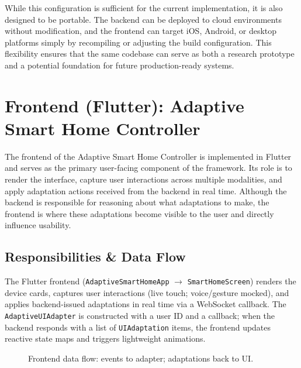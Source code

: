 \documentclass[openany]{book}
\begin{document}
While this configuration is sufficient for the current implementation, it is also designed to be portable. The backend can be deployed to cloud environments without modification, and the frontend can target iOS, Android, or desktop platforms simply by recompiling or adjusting the build configuration. This flexibility ensures that the same codebase can serve as both a research prototype and a potential foundation for future production-ready systems.

\section{Frontend (Flutter): Adaptive Smart Home Controller}
The frontend of the Adaptive Smart Home Controller is implemented in Flutter and serves as the primary user-facing component of the framework. Its role is to render the interface, capture user interactions across multiple modalities, and apply adaptation actions received from the backend in real time. Although the backend is responsible for reasoning about what adaptations to make, the frontend is where these adaptations become visible to the user and directly influence usability.

\subsection{Responsibilities \& Data Flow}
The Flutter frontend (\texttt{AdaptiveSmartHomeApp} $\rightarrow$ \texttt{SmartHomeScreen}) renders the device cards, captures user interactions (live touch; voice/gesture mocked), and applies backend-issued adaptations in real time via a WebSocket callback. The \texttt{AdaptiveUIAdapter} is constructed with a user ID and a callback; when the backend responds with a list of \texttt{UIAdaptation} items, the frontend updates reactive state maps and triggers lightweight animations.

\begin{figure}[h]
\centering
{}
\caption{Frontend data flow: events to adapter; adaptations back to UI.}
\end{figure}
\end{document}
